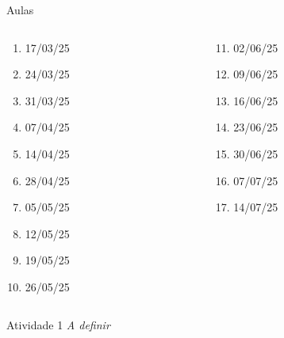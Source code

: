 \documentclass[t,%
brazilian,%
11pt,%
aspectratio=169,%
table%
]{beamer}
\begin{document}
\begin{frame}{Aulas}
    \begin{columns}
        \begin{column}{0.45\textwidth}
            \begin{enumerate}
                \item 17/03/25
                \item 24/03/25
                \item 31/03/25
                \item 07/04/25
                \item 14/04/25
                \item 28/04/25
                \item 05/05/25
                \item 12/05/25
                \item 19/05/25
                \item 26/05/25
            \end{enumerate}
        \end{column}

        \begin{column}{0.45\textwidth}
            \begin{enumerate}\setcounter{enumi}{10}
                \item 02/06/25
                \item 09/06/25
                \item 16/06/25
                \item 23/06/25
                \item 30/06/25
                \item 07/07/25
                \item 14/07/25
            \end{enumerate}
        \end{column}
    \end{columns}
\end{frame}


\begin{frame}{Atividade 1}
    \textit{A definir}
\end{frame}
\end{document}
